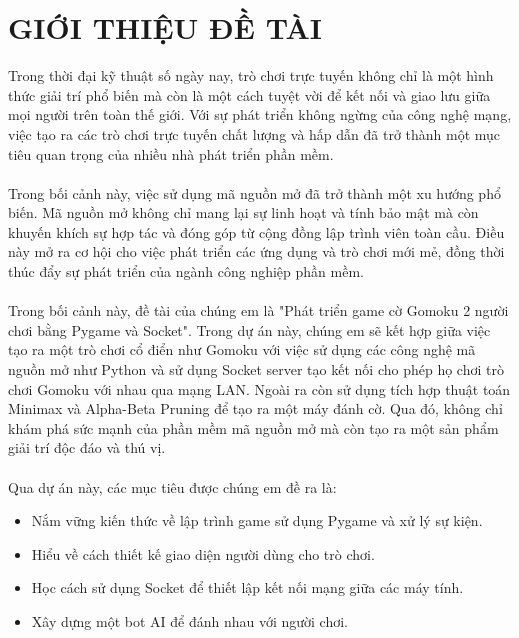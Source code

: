 \documentclass[a4paper]{article}
\begin{document}
\thispagestyle{empty}

\newpage
\tableofcontents
\newpage



\section{GIỚI THIỆU ĐỀ TÀI}
    Trong thời đại kỹ thuật số ngày nay, trò chơi trực tuyến không chỉ là một hình thức giải trí phổ biến mà còn là một cách tuyệt vời để kết nối và giao lưu giữa mọi người trên toàn thế giới. Với sự phát triển không ngừng của công nghệ mạng, việc tạo ra các trò chơi trực tuyến chất lượng và hấp dẫn đã trở thành một mục tiêu quan trọng của nhiều nhà phát triển phần mềm. \\
    \\
    Trong bối cảnh này, việc sử dụng mã nguồn mở đã trở thành một xu hướng phổ biến. Mã nguồn mở không chỉ mang lại sự linh hoạt và tính bảo mật mà còn khuyến khích sự hợp tác và đóng góp từ cộng đồng lập trình viên toàn cầu. Điều này mở ra cơ hội cho việc phát triển các ứng dụng và trò chơi mới mẻ, đồng thời thúc đẩy sự phát triển của ngành công nghiệp phần mềm. \\
    \\
    Trong bối cảnh này, đề tài của chúng em là "Phát triển game cờ Gomoku 2 người chơi bằng Pygame và Socket". Trong dự án này, chúng em sẽ kết hợp giữa việc tạo ra một trò chơi cổ điển như Gomoku với việc sử dụng các công nghệ mã nguồn mở như Python và sử dụng Socket server tạo kết nối cho phép họ chơi trò chơi Gomoku với nhau qua mạng LAN. Ngoài ra còn sử dụng tích hợp thuật toán Minimax và Alpha-Beta Pruning để tạo ra một máy đánh cờ. Qua đó, không chỉ khám phá sức mạnh của phần mềm mã nguồn mở mà còn tạo ra một sản phẩm giải trí độc đáo và thú vị. \\
    \\
    Qua dự án này, các mục tiêu được chúng em đề ra là:
    
    \begin{itemize}
        \item Nắm vững kiến thức về lập trình game sử dụng Pygame và xử lý sự kiện.
        \item Hiểu về cách thiết kế giao diện người dùng cho trò chơi.
        \item Học cách sử dụng Socket để thiết lập kết nối mạng giữa các máy tính.
        \item Xây dựng một bot AI để đánh nhau với người chơi.
    \end{itemize}
    
\end{document}
